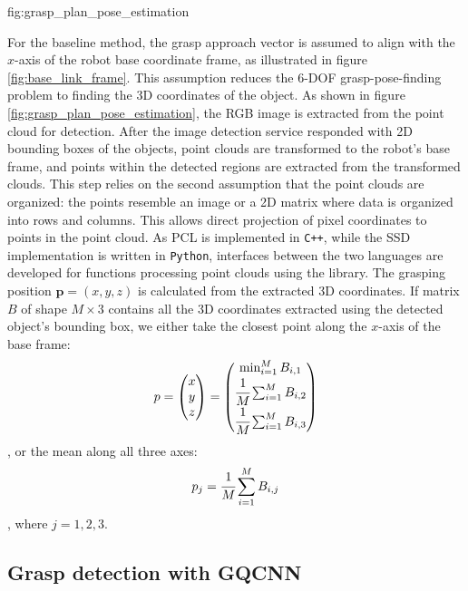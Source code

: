              {fig:grasp_plan_pose_estimation}{\textwidth}

For the baseline method, the grasp approach vector is assumed to align with the $ x $-axis of the robot base coordinate
frame, as illustrated in figure \ref{fig:base_link_frame}. This assumption reduces the 6-DOF grasp-pose-finding problem
to finding the 3D coordinates of the object. As shown in figure \ref{fig:grasp_plan_pose_estimation}, the RGB image is
extracted from the point cloud for detection. After the image detection service responded with 2D bounding boxes of the
objects, point clouds are transformed to the robot's base frame, and points within the detected regions are extracted
from the transformed clouds. This step relies on the second assumption that the point clouds are organized: the points
resemble an image or a 2D matrix where data is organized into rows and columns. This allows direct projection of pixel
coordinates to points in the point cloud. As PCL is implemented in \texttt{C++}, while the SSD implementation is
written in \texttt{Python}, interfaces between the two languages are developed for functions processing point clouds
using the  library. The grasping
position $ \mathbf{p} = (x, y, z) $ is calculated from the extracted 3D coordinates. If matrix $ B $ of shape
$ M \times 3 $ contains all the 3D coordinates extracted using the detected object's bounding box, we either take the
closest point along the $ x $-axis of the base frame:
\[ p = \left( \begin{matrix}
x \\ y \\ z
\end{matrix} \right) =
\left( \begin{matrix}
\min_{i = 1}^M B_{i,1} \\
\cfrac{1}{M} \sum_{i = 1}^{M} B_{i,2} \\
\cfrac{1}{M} \sum_{i = 1}^{M} B_{i,3}
\end{matrix} \right) \],
or the mean along all three axes:
\[ p_j = \cfrac{1}{M} \sum_{i = 1}^{M} B_{i,j} \],
where $ j = 1, 2, 3 $.

\subsection{Grasp detection with GQCNN}

